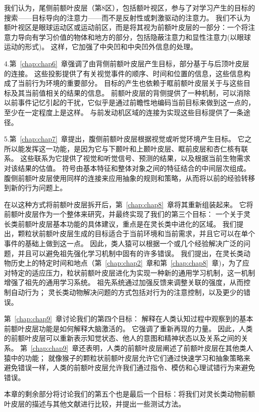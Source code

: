 我们认为，尾侧前额叶皮层（第8区），包括额叶视区，参与了对学习产生的目标的搜索——目标导向的注意力——而不是反射性或刺激驱动的注意力。
我们不认为额叶视区是眼球运动区或运动前区，而是将其视为前额叶皮层的一部分：一个将注意力导向有学习价值的物体和地方的部分，包括隐蔽注意力和显性注意力(以眼球运动的形式)。
这样，它加强了中央凹和中央凹外信息的处理。
\par 
4.第~\ref{chap:chap6}~章强调了由背侧前额叶皮层产生目标，部分基于与后顶叶皮层的连接。
这些投影提供了有关视觉事件的顺序、时间和位置的信息，这些信息构成了当前行为环境的重要部分。
目标的产生也依赖于眶前额叶皮层关于与这些目标及其当前值相关的结果的信息。
前额叶皮层的背侧提供了一种机制，可以消除以前事件记忆引起的干扰，它似乎是通过前瞻性地编码当前目标来做到这一点的，至少在一定程度上是这样。
与前发动机区域的连接为实现这些目标提供了一条途径。
\par 
5.第~\ref{chap:chap7}~章提出，腹侧前额叶皮层根据视觉或听觉环境产生目标。
它之所以能发挥这一功能，是因为它与下颞叶和上颞叶皮层、眶前皮层和杏仁核有联系。
这些联系为它提供了视觉和听觉信号、预测的结果，以及根据当前生物需求对该结果的估值。
符号由基本特征和整体对象之间的特征结合的中间层次组成。
腹侧前额叶皮层使用同样的连接来应用抽象的规则和策略，从而将以前的经验转移到新的行为问题上。
\par 
在以这种方式将前额叶皮层拆开后，第~\ref{chap:chap8}~章将其重新组装起来。
它将前额叶皮层作为一个整体来研究，并最终实现了我们的第三个目标：
一个关于灵长类前额叶皮层基本功能的具体建议，重点是在灵长类中进化的区域。
我们提出，颗粒状前额叶皮层生成的目标适合于当前环境和当前需求，并且它可以在单个事件的基础上做到这一点。
因此，类人猿可以根据一个或几个经验解决广泛的问题，并且可以避免祖先强化学习机制中固有的许多错误。
我们提出，在灵长类动物历史上的特定时间和地点（第~\ref{chap:chap2}~章和第~\ref{chap:chap8}~章)，为了应对特定的适应压力，粒状前额叶皮层进化为实现一种新的通用学习机制，这一机制增强了祖先的通用学习系统。
祖先系统通过加强反馈来调整关联的强度，从而控制自动行为；
灵长类动物解决问题的方式包括对行为的注意控制，以及更少的错误。
\par 
第~\ref{chap:chap9}~章讨论我们的第四个目标：
解释在人类认知过程中观察到的基本前额叶皮层功能是如何解释大脑激活的。
它强调了重新再现的力量。
因此，人类的前额叶皮层可以重新表示知觉状态、他人的意图和精神状态以及关系之间的关系。
第~\ref{chap:chap9}~章还表明，人类的前额叶皮层阐述了前额叶皮层在其他类人猿中的功能；
就像猴子的颗粒状前额叶皮层允许它们通过快速学习和抽象策略来避免错误一样，人类的前额叶皮层允许我们通过指令、模仿和心理试错行为来避免错误。
\par 
本章的剩余部分将讨论我们的第五个也是最后一个目标：将我们对灵长类动物前额叶皮层的描述与其他文献进行比较，并提出一些测试方法。
